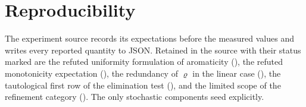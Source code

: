 \documentclass[11pt,a4paper]{article}
\theoremstyle{clthm}
\theoremstyle{definition}
\theoremstyle{remark}
\newcommand{\circu}{\varrho}
\begin{document}
\section*{Reproducibility}

The experiment source records its expectations before the measured values
and writes every reported quantity to JSON. Retained in the source with
their status marked are the refuted uniformity formulation of aromaticity
(), the refuted monotonicity expectation
(), the redundancy of $\circu$ in the linear case
(), the tautological first row of the elimination
test (), and the limited scope of the refinement
category (). The only stochastic components seed
explicitly.



\end{document}
